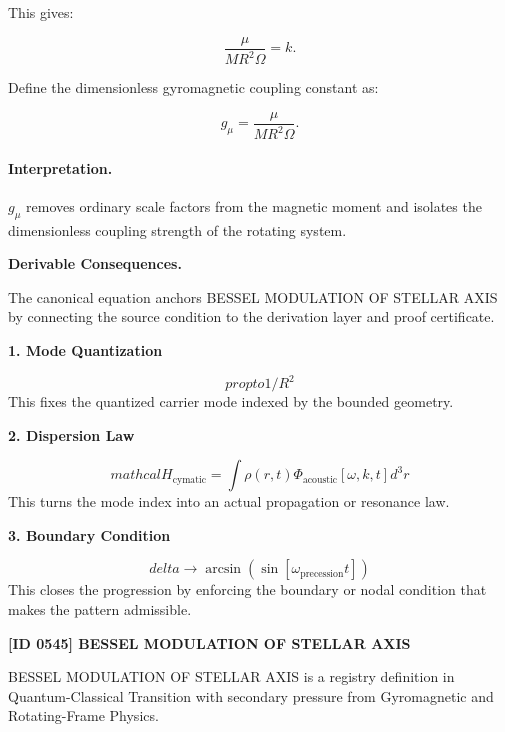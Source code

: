 This gives:

\begin{equation}
\frac{\mu}{MR^2\Omega}=k .
\end{equation}

Define the dimensionless gyromagnetic coupling constant as:

\begin{equation}
\boxed{
g_{\mu}
=
\frac{\mu}
{MR^2\Omega}.
}
\end{equation}

\paragraph{Interpretation.}
$g_{\mu}$ removes ordinary scale factors from the magnetic moment and isolates the dimensionless coupling strength of the rotating system.

\par\vspace{0.35em}
\noindent\textbf{Derivable Consequences.}\quad
\begingroup
\footnotesize
\raggedright
The canonical equation anchors BESSEL MODULATION OF STELLAR AXIS by connecting the source condition to the derivation layer and proof certificate.
\par\endgroup

\noindent\textbf{1. Mode Quantization}\par
\[
propto 1/R^2
\]
\noindent This fixes the quantized carrier mode indexed by the bounded geometry.\par
\noindent\textbf{2. Dispersion Law}\par
\[
mathcal{H}_{\text{cymatic}} = \int \rho(r,t) \Phi_{\text{acoustic}}[\omega,k,t] d^3r
\]
\noindent This turns the mode index into an actual propagation or resonance law.\par
\noindent\textbf{3. Boundary Condition}\par
\[
delta \to \arcsin(\sin[\omega_{\text{precession}} t])
\]
\noindent This closes the progression by enforcing the boundary or nodal condition that makes the pattern admissible.\par

\clearpage
\noindent\textbf{[ID 0545] BESSEL MODULATION OF STELLAR AXIS}\par
\vspace{0.35em}
\begingroup\small
{}
BESSEL MODULATION OF STELLAR AXIS is a registry definition in Quantum-Classical Transition with secondary pressure from Gyromagnetic and Rotating-Frame Physics.

